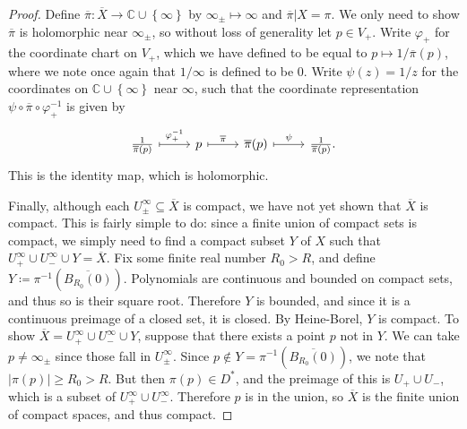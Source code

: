 \documentclass[11pt, letterpaper]{article}
\theoremstyle{plain}
\begin{document}
\begin{proof}
Define $\overline{\pi } : \overline{X}  \to \mathbb{C} \cup \left\{ \infty  \right\} $ by $\infty _\pm \mapsto \infty $ and $\overline{\pi } |X = \pi $. We only need to show $\overline{\pi } $ is holomorphic near $\infty _\pm$, so without loss of generality let $p\in V_+$. Write $\varphi _+$ for the coordinate chart on $V_+$, which we have defined to be equal to $p\mapsto 1/ \overline{\pi } (p)$, where we note once again that $1/\infty$ is defined to be $0$. Write $\psi(z) = 1/z$ for the coordinates on $\mathbb{C} \cup \left\{ \infty  \right\} $ near $\infty $, such that the coordinate representation $\psi \circ \overline{\pi } \circ \varphi _+^{-1} $ is given by
\[\begin{tikzcd}[row sep = 2.5em, column sep = 2.5em]
	\frac{1}{\overline{\pi } (p)} \ar[" \varphi _+^{-1}  ", mapsto, r]  & p \ar[" \overline{\pi }  ", mapsto, r]  & \overline{\pi } (p) \ar[" \psi  ", mapsto, r] &  \frac{1}{\overline{\pi }(p) } .
\end{tikzcd}\]
This is the identity map, which is holomorphic.

Finally, although each $U_\pm^\infty  \subseteq \overline{X} $ is compact, we have not yet shown that $\overline{X} $ is compact. This is fairly simple to do: since a finite union of compact sets is compact, we simply need to find a compact subset $Y$ of $X$ such that $U_+^\infty \cup U_-^\infty  \cup Y = \overline{X} $. Fix some finite real number $R_0 > R$, and define $Y\coloneqq \pi ^{-1} (\overline{B_{R_0} (0)} )$. Polynomials are continuous and bounded on compact sets, and thus so is their square root. Therefore $Y$ is bounded, and since it is a continuous preimage of a closed set, it is closed. By Heine-Borel, $Y$ is compact. To show $\overline{X} =U_+^\infty  \cup U_-^\infty  \cup Y$, suppose that there exists a point $p$ not in $Y$. We can take $p\neq \infty _\pm$ since those fall in $U_\pm^\infty $. Since $p\notin Y = \pi ^{-1} (\overline{B_{R_0} (0)})$, we note that $\left|\pi (p)\right| \geq  R_0 > R$. But then $\pi (p)\in D^*$, and the preimage of this is $U_+ \cup U_-$, which is a subset of $U_+^\infty \cup U_-^\infty $. Therefore $p$ is in the union, so $\overline{X} $ is the finite union of compact spaces, and thus compact.
\end{proof}
\end{document}
